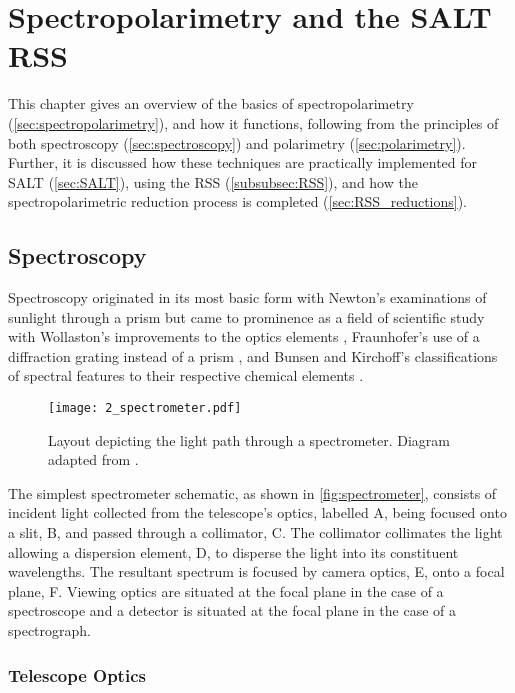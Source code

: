 \chapter{Spectropolarimetry and the SALT RSS}

This chapter gives an overview of the basics of spectropolarimetry (\autoref{sec:spectropolarimetry}), and how it functions, following from the principles of both spectroscopy (\autoref{sec:spectroscopy}) and polarimetry (\autoref{sec:polarimetry}). Further, it is discussed how these techniques are practically implemented for \gls{SALT} (\autoref{sec:SALT}), using the \gls{RSS} (\autoref{subsubsec:RSS}), and how the spectropolarimetric reduction process is completed (\autoref{sec:RSS_reductions}).

\section{Spectroscopy} \label{sec:spectroscopy}

Spectroscopy originated in its most basic form with Newton's examinations of sunlight through a prism \citep{opticks} but came to prominence as a field of scientific study with Wollaston's improvements to the optics elements \citep{WollPrism}, Fraunhofer's use of a diffraction grating instead of a prism \citep{FraunGrating}, and Bunsen and Kirchoff's classifications of spectral features to their respective chemical elements \citep{KirBunSpec}.

\begin{figure}[t]
    \centering
    \texttt{[image: 2\_spectrometer.pdf]}
    \caption{Layout depicting the light path through a spectrometer. Diagram adapted from \cite{BirneyObsAstro}.}
    \label{fig:spectrometer}
\end{figure}

The simplest spectrometer schematic, as shown in \autoref{fig:spectrometer}, consists of incident light collected from the telescope's optics, labelled A, being focused onto a slit, B, and passed through a collimator, C. The collimator collimates the light allowing a dispersion element, D, to disperse the light into its constituent wavelengths. The resultant spectrum is focused by camera optics, E, onto a focal plane, F. Viewing optics are situated at the focal plane in the case of a spectroscope and a detector is situated at the focal plane in the case of a spectrograph.

\subsection{Telescope Optics}

